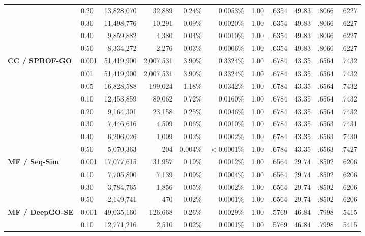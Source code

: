 \begin{table}[!h]
\begin{tabular}{ll rrrr r cccc}
 & 0.20  & 13{,}828{,}070 &    32{,}889 & 0.24\% & 0.0053\% & 1.00 & .6354 & 49.83 & .8066 & .6227 \\
 & 0.30  & 11{,}498{,}776 &    10{,}291 & 0.09\% & 0.0020\% & 1.00 & .6354 & 49.83 & .8066 & .6227 \\
 & 0.40  &  9{,}859{,}882 &     4{,}380 & 0.04\% & 0.0010\% & 1.00 & .6354 & 49.83 & .8066 & .6227 \\
 & 0.50  &  8{,}334{,}272 &     2{,}276 & 0.03\% & 0.0006\% & 1.00 & .6354 & 49.83 & .8066 & .6227 \\
\addlinespace[2pt]
\textbf{CC / SPROF-GO}
 & 0.001 & 51{,}419{,}900 & 2{,}007{,}531 & 3.90\% & 0.3324\% & 1.00 & .6784 & 43.35 & .6564 & .7432 \\
 & 0.01  & 51{,}419{,}900 & 2{,}007{,}531 & 3.90\% & 0.3324\% & 1.00 & .6784 & 43.35 & .6564 & .7432 \\
 & 0.05  & 16{,}828{,}588 &   199{,}024 & 1.18\% & 0.0342\% & 1.00 & .6784 & 43.35 & .6564 & .7432 \\
 & 0.10  & 12{,}453{,}859 &    89{,}062 & 0.72\% & 0.0160\% & 1.00 & .6784 & 43.35 & .6564 & .7432 \\
 & 0.20  &  9{,}164{,}301 &    23{,}158 & 0.25\% & 0.0046\% & 1.00 & .6784 & 43.35 & .6564 & .7432 \\
 & 0.30  &  7{,}446{,}616 &     4{,}509 & 0.06\% & 0.0010\% & 1.00 & .6784 & 43.35 & .6563 & .7431 \\
 & 0.40  &  6{,}206{,}026 &     1{,}009 & 0.02\% & 0.0002\% & 1.00 & .6784 & 43.35 & .6563 & .7430 \\
 & 0.50  &  5{,}070{,}363 &       204 & 0.004\% & $<$0.0001\% & 1.00 & .6784 & 43.35 & .6563 & .7427 \\
\midrule
\textbf{MF / Seq-Sim}
 & 0.001 & 17{,}077{,}615 &    31{,}957 & 0.19\% & 0.0012\% & 1.00 & .6564 & 29.74 & .8502 & .6206 \\
 & 0.10  &  7{,}705{,}800 &     7{,}139 & 0.09\% & 0.0004\% & 1.00 & .6564 & 29.74 & .8502 & .6206 \\
 & 0.30  &  3{,}784{,}765 &     1{,}856 & 0.05\% & 0.0002\% & 1.00 & .6564 & 29.74 & .8502 & .6206 \\
 & 0.50  &  2{,}149{,}741 &       470 & 0.02\% & 0.0001\% & 1.00 & .6564 & 29.74 & .8502 & .6206 \\
\addlinespace[2pt]
\textbf{MF / DeepGO-SE}
 & 0.001 & 49{,}035{,}160 &   126{,}668 & 0.26\% & 0.0029\% & 1.00 & .5769 & 46.84 & .7998 & .5415 \\
 & 0.10  & 12{,}771{,}216 &     2{,}510 & 0.02\% & 0.0001\% & 1.00 & .5769 & 46.84 & .7998 & .5415 \\

\end{tabular}
\end{table}
